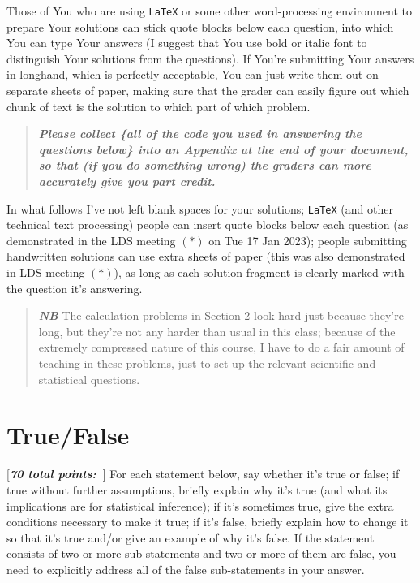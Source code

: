\documentclass[12pt]{article}
\newcommand{\bi}[1]{\b{\i{#1}}}
\renewcommand{\b}[1]{\textbf{#1}}
\renewcommand{\i}[1]{\textit{#1}}
\renewcommand{\t}[1]{\texttt{#1}}
\begin{document}
Those of You who are using \texttt{LaTeX} or some other word-processing environment to prepare Your solutions can stick quote blocks below each question, into which You can type Your answers (I suggest that You use bold or italic font to distinguish Your solutions from the questions). If You're submitting Your answers in longhand, which is perfectly acceptable, You can just write them out on separate sheets of paper, making sure that the grader can easily figure out which chunk of text is the solution to which part of which problem.

\begin{quote}

\bi{Please collect \{all of the code you used in answering the questions below\} into an Appendix at the end of your document, so that (if you do something wrong) the graders can more accurately give you part credit.} 

\end{quote}

In what follows I've not left blank spaces for your solutions; \t{LaTeX} (and other technical text processing) people can insert quote blocks below each question (as demonstrated in the LDS meeting $( * )$ on Tue 17 Jan 2023); people submitting handwritten solutions can use extra sheets of paper (this was also demonstrated in LDS meeting $( * )$), as long as each solution fragment is clearly marked with the question it's answering. 

\begin{quote}

\bi{NB} The calculation problems in Section 2 look hard just because they're long, but they're not any harder than usual in this class; because of the extremely compressed nature of this course, I have to do a fair amount of teaching in these problems, just to set up the relevant scientific and statistical questions. 

\end{quote}

\section{True/False}

[\bi{70 total points:~}] \vspace*{0.025in} For each statement below, say whether it's true or false; if true without further assumptions, briefly explain why it's true (and what its implications are for statistical inference); if it's sometimes true, give the extra conditions necessary to make it true; if it's false, briefly explain how to change it so that it's true and/or give an example of why it's false. If the statement consists of two or more sub-statements and two or more of them are false, you need to explicitly address all of the false sub-statements in your answer. \vspace*{-0.1in}
\end{document}
